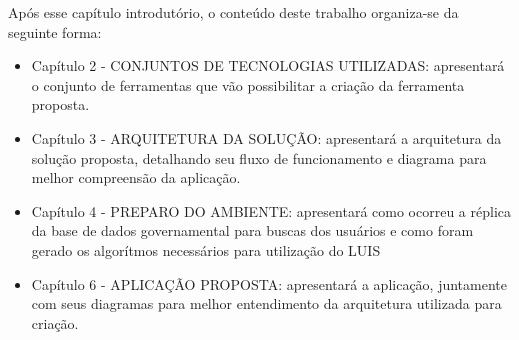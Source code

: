 Após esse capítulo introdutório, o conteúdo deste trabalho organiza-se da seguinte forma:
	\begin{itemize}
		\item{Capítulo 2 - \uppercase{Conjuntos de tecnologias utilizadas}: apresentará o conjunto de ferramentas que vão possibilitar a criação da ferramenta proposta.}
		\item{Capítulo 3 - \uppercase{Arquitetura da solução}: apresentará a arquitetura da solução proposta, detalhando seu fluxo de funcionamento e diagrama para melhor compreensão da aplicação.}
		\item{Capítulo 4 - \uppercase{Preparo do ambiente}: apresentará como ocorreu a réplica da base de dados governamental para buscas dos usuários e como foram gerado os algorítmos necessários para utilização do LUIS}
		\item{Capítulo 6 - \uppercase{Aplicação proposta}: apresentará a aplicação, juntamente com seus diagramas para melhor entendimento da arquitetura utilizada para criação.}
	\end{itemize}
